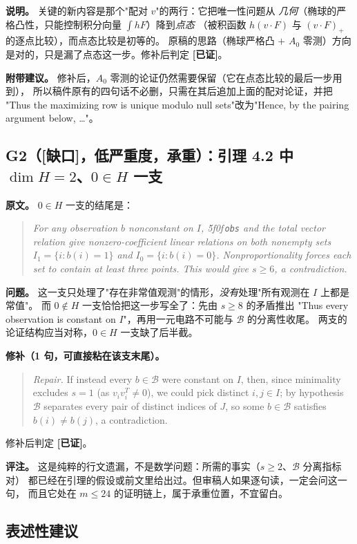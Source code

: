 \documentclass[UTF8,11pt]{ctexart}
\theoremstyle{definition}
\newcommand{\peq}[1]{\textup{\u5f0f}\,\texttt{#1}}
\newcommand{\ok}{\textcolor[rgb]{0.05,0.45,0.15}{\bfseries [已证]}}
\newcommand{\gap}{\textcolor[rgb]{0.70,0.15,0.10}{\bfseries [缺口]}}
\begin{document}
\noindent\textbf{说明。} 关键的新内容是那个"配对 $v$"的两行：它把唯一性问题从
\emph{几何}（椭球的严格凸性，只能控制积分向量 $\int hF$）降到\emph{点态}
（被积函数 $h(v\cdot F)$ 与 $(v\cdot F)_+$ 的逐点比较），而点态比较是初等的。
原稿的思路（椭球严格凸 $+$ $A_0$ 零测）方向是对的，只是漏了点态这一步。修补后判定 \ok。

\textbf{附带建议。} 修补后，$A_0$ 零测的论证仍然需要保留（它在点态比较的最后一步用到），
所以稿件原有的四句话不必删，只需在其后追加上面的配对论证，并把
"Thus the maximizing row is unique modulo null sets"改为"Hence, by the pairing argument below,
\ldots"。

\subsection{G2（\gap，低严重度，承重）：引理 4.2 中 $\dim H=2$、$0\in H$ 一支}
\label{sec:g2}

\textbf{原文。} $0\in H$ 一支的结尾是：
\begin{quote}\small\itshape
For any observation $b$ nonconstant on $I$, \peq{obs} and the total vector relation give
nonzero-coefficient linear relations on both nonempty sets $I_1=\{i:b(i)=1\}$ and
$I_0=\{i:b(i)=0\}$. Nonproportionality forces each set to contain at least three points.
This would give $s\ge6$, a contradiction.
\end{quote}

\textbf{问题。} 这一支只处理了"存在非常值观测"的情形，\emph{没有}处理"所有观测在 $I$ 上都是常值"。
而 $0\notin H$ 一支恰恰把这一步写全了：先由 $s\ge8$ 的矛盾推出
"Thus every observation is constant on $I$"，再用一元电路不可能与 $\mathcal B$ 的分离性收尾。
两支的论证结构应当对称，$0\in H$ 一支缺了后半截。

\textbf{修补（1 句，可直接粘在该支末尾）。}
\begin{quote}\small
\emph{Repair.} If instead every $b\in\mathcal B$ were constant on $I$, then, since minimality
excludes $s=1$ (as $v_iv_i^T\ne0$), we could pick distinct $i,j\in I$; by hypothesis
$\mathcal B$ separates every pair of distinct indices of $J$, so some $b\in\mathcal B$ satisfies
$b(i)\ne b(j)$, a contradiction.
\end{quote}
修补后判定 \ok。

\textbf{评注。} 这是纯粹的行文遗漏，不是数学问题：所需的事实（$s\ge2$、$\mathcal B$ 分离指标对）
都已经在引理的假设或前文里给出过。但审稿人如果逐句读，一定会问这一句，
而且它处在 $m\le24$ 的证明链上，属于承重位置，不宜留白。

\subsection{表述性建议}
\end{document}
